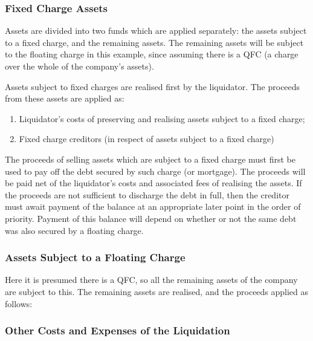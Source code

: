 \documentclass[
]{article}
\providecommand{\tightlist}{%
  \setlength{\itemsep}{0pt}\setlength{\parskip}{0pt}}
\begin{document}
\hypertarget{fixed-charge-assets}{%
\subsubsection{Fixed Charge Assets}\label{fixed-charge-assets}}

Assets are divided into two funds which are applied separately: the
assets subject to a fixed charge, and the remaining assets. The
remaining assets will be subject to the floating charge in this example,
since assuming there is a QFC (a charge over the whole of the company's
assets).

Assets subject to fixed charges are realised first by the liquidator.
The proceeds from these assets are applied as:

\begin{enumerate}
\tightlist
\item
  Liquidator's costs of preserving and realising assets subject to a
  fixed charge;
\item
  Fixed charge creditors (in respect of assets subject to a fixed
  charge)
\end{enumerate}

The proceeds of selling assets which are subject to a fixed charge must
first be used to pay off the debt secured by such charge (or mortgage).
The proceeds will be paid net of the liquidator's costs and associated
fees of realising the assets. If the proceeds are not sufficient to
discharge the debt in full, then the creditor must await payment of the
balance at an appropriate later point in the order of priority. Payment
of this balance will depend on whether or not the same debt was also
secured by a floating charge.

\hypertarget{assets-subject-to-a-floating-charge}{%
\subsubsection{Assets Subject to a Floating
Charge}\label{assets-subject-to-a-floating-charge}}

Here it is presumed there is a QFC, so all the remaining assets of the
company are subject to this. The remaining assets are realised, and the
proceeds applied as follows:

\hypertarget{other-costs-and-expenses-of-the-liquidation}{%
\subsubsection{Other Costs and Expenses of the
Liquidation}\label{other-costs-and-expenses-of-the-liquidation}}
\end{document}
